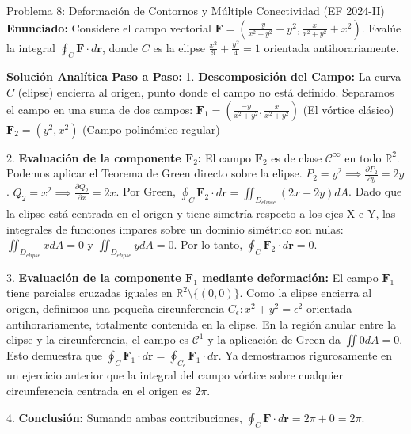\documentclass[11pt,a4paper]{article}
\begin{document}
\begin{ejerciciobox}{Problema 8: Deformación de Contornos y Múltiple Conectividad (EF 2024-II)}
\textbf{Enunciado:}
Considere el campo vectorial $\mathbf{F} = \left( \frac{-y}{x^2+y^2} + y^2, \frac{x}{x^2+y^2} + x^2 \right)$. Evalúe la integral $\oint_C \mathbf{F} \cdot d\mathbf{r}$, donde $C$ es la elipse $\frac{x^2}{9} + \frac{y^2}{4} = 1$ orientada antihorariamente.

\textbf{Solución Analítica Paso a Paso:}
1. \textbf{Descomposición del Campo:}
La curva $C$ (elipse) encierra al origen, punto donde el campo no está definido.
Separamos el campo en una suma de dos campos:
$\mathbf{F}_1 = \left( \frac{-y}{x^2+y^2}, \frac{x}{x^2+y^2} \right)$ (El vórtice clásico)
$\mathbf{F}_2 = \left( y^2, x^2 \right)$ (Campo polinómico regular)

2. \textbf{Evaluación de la componente $\mathbf{F}_2$:}
El campo $\mathbf{F}_2$ es de clase $\mathcal{C}^\infty$ en todo $\mathbb{R}^2$. Podemos aplicar el Teorema de Green directo sobre la elipse.
$P_2 = y^2 \implies \frac{\partial P_2}{\partial y} = 2y$.
$Q_2 = x^2 \implies \frac{\partial Q_2}{\partial x} = 2x$.
Por Green, $\oint_C \mathbf{F}_2 \cdot d\mathbf{r} = \iint_{D_{elipse}} (2x - 2y) dA$.
Dado que la elipse está centrada en el origen y tiene simetría respecto a los ejes X e Y, las integrales de funciones impares sobre un dominio simétrico son nulas:
$\iint_{D_{elipse}} x dA = 0$ y $\iint_{D_{elipse}} y dA = 0$.
Por lo tanto, $\oint_C \mathbf{F}_2 \cdot d\mathbf{r} = 0$.

3. \textbf{Evaluación de la componente $\mathbf{F}_1$ mediante deformación:}
El campo $\mathbf{F}_1$ tiene parciales cruzadas iguales en $\mathbb{R}^2 \setminus \{(0,0)\}$.
Como la elipse encierra al origen, definimos una pequeña circunferencia $C_\epsilon: x^2+y^2=\epsilon^2$ orientada antihorariamente, totalmente contenida en la elipse.
En la región anular entre la elipse y la circunferencia, el campo es $\mathcal{C}^1$ y la aplicación de Green da $\iint 0 dA = 0$.
Esto demuestra que $\oint_C \mathbf{F}_1 \cdot d\mathbf{r} = \oint_{C_\epsilon} \mathbf{F}_1 \cdot d\mathbf{r}$.
Ya demostramos rigurosamente en un ejercicio anterior que la integral del campo vórtice sobre cualquier circunferencia centrada en el origen es $2\pi$.

4. \textbf{Conclusión:}
Sumando ambas contribuciones, $\oint_C \mathbf{F} \cdot d\mathbf{r} = 2\pi + 0 = 2\pi$.
\end{ejerciciobox}
\end{document}
